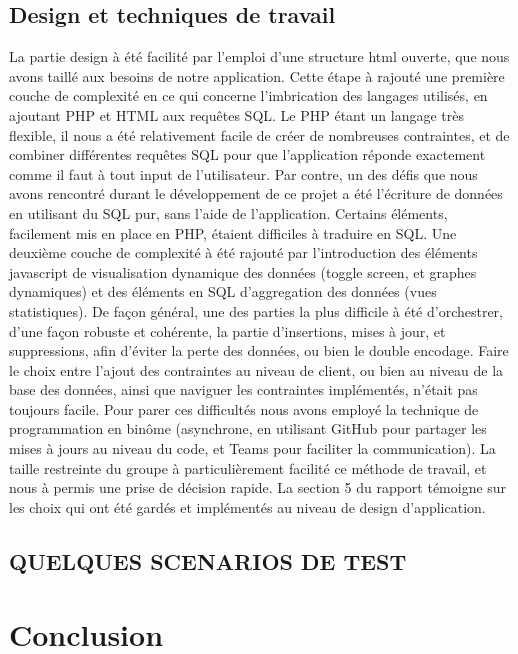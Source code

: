 \documentclass[a4paper,12pt]{article}
\begin{document}
\subsection {Design et techniques de travail }

La partie design à été facilité par l'emploi d'une structure html ouverte, que nous avons taillé aux besoins de notre application. Cette étape à rajouté une première couche de complexité en ce qui concerne l'imbrication des langages utilisés, en ajoutant PHP et HTML aux requêtes SQL. Le PHP étant un langage très flexible, il nous a été relativement facile de créer de nombreuses contraintes, et de combiner différentes requêtes SQL pour que l'application réponde exactement comme il faut à tout input de l'utilisateur. 
Par contre, un des défis que nous avons rencontré durant le développement de ce projet a été l'écriture de données en utilisant du SQL pur, sans l'aide de l'application. Certains éléments, facilement mis en place en PHP, étaient difficiles à traduire en SQL.
Une deuxième couche de complexité à été rajouté par l'introduction des éléments javascript de visualisation dynamique des données (toggle screen, et graphes dynamiques) et des éléments en SQL d'aggregation des données (vues statistiques). De façon général, une des parties la plus difficile à été d'orchestrer, d'une façon robuste et cohérente, la partie d'insertions, mises à jour, et suppressions, afin d'éviter la perte des données, ou bien le double encodage. Faire le choix entre l'ajout des contraintes au niveau de client, ou bien au niveau de la base des données, ainsi que naviguer les contraintes implémentés, n'était pas toujours facile. Pour parer ces difficultés nous avons employé la technique de programmation en binôme (asynchrone, en utilisant GitHub pour partager les mises à jours au niveau du code, et Teams pour faciliter la communication). La taille restreinte du groupe à particulièrement facilité ce méthode de travail, et nous à permis une prise de décision rapide.
La section 5 du rapport témoigne sur les choix qui ont été gardés et implémentés au niveau de design d'application.




\subsection {QUELQUES SCENARIOS DE TEST}

\newpage
\section{Conclusion}
\end{document}
